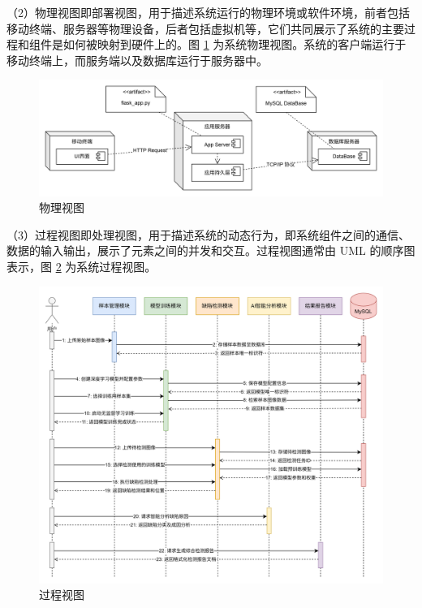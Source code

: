 \documentclass[
  ]{njuthesis}
\begin{document}
（2）物理视图即部署视图，用于描述系统运行的物理环境或软件环境，前者包括移动终端、服务器等物理设备，后者包括虚拟机等，它们共同展示了系统的主要过程和组件是如何被映射到硬件上的。图 \ref{物理视图} 为系统物理视图。系统的客户端运行于移动终端上，而服务端以及数据库运行于服务器中。

\begin{figure}[H]
    \centering
    \includegraphics[width=\textwidth]{images/物理视图.png}
    \caption{物理视图}
    \label{物理视图}
\end{figure}

（3）过程视图即处理视图，用于描述系统的动态行为，即系统组件之间的通信、数据的输入输出，展示了元素之间的并发和交互。过程视图通常由 UML 的顺序图表示，图 \ref{过程视图} 为系统过程视图。

\begin{figure}[H]
    \centering
    \includegraphics[width=\textwidth]{images/过程视图.png}
    \caption{过程视图}
    \label{过程视图}
\end{figure}
\end{document}
